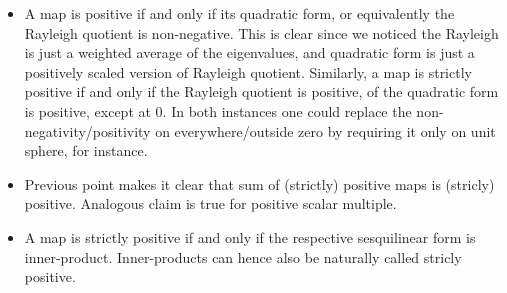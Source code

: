 \begin{itemize}
	\item A map is positive if and only if its quadratic form, or equivalently the Rayleigh quotient is non-negative. This is clear since we noticed the Rayleigh is just a weighted average of the eigenvalues, and quadratic form is just a positively scaled version of Rayleigh quotient. Similarly, a map is strictly positive if and only if the Rayleigh quotient is positive, of the quadratic form is positive, except at $0$. In both instances one could replace the non-negativity/positivity on everywhere/outside zero by requiring it only on unit sphere, for instance.
	\item Previous point makes it clear that sum of (strictly) positive maps is (stricly) positive. Analogous claim is true for positive scalar multiple.
	\item A map is strictly positive if and only if the respective sesquilinear form is inner-product. Inner-products can hence also be naturally called stricly positive.


\end{itemize}
